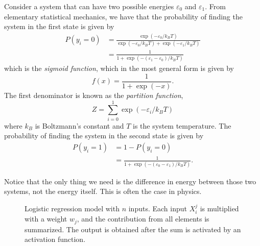 Consider a system that can have two possible energies $\varepsilon_0$ and $\varepsilon_1$. From elementary statistical mechanics, we have that the probability of finding the system in the first state is given by
\begin{align}
P(y_i=0)&=\frac{\exp(-\varepsilon_0/k_BT)}{\exp(-\varepsilon_0/k_BT)+\exp(-\varepsilon_1/k_BT)}\\
&=\frac{1}{1+\exp(-(\varepsilon_1-\varepsilon_0)/k_BT)}
\end{align}
which is the \textit{sigmoid function}, which in the most general form is given by
\begin{equation}
f(x)=\frac{1}{1+\exp(-x)}.
\end{equation}
The first denominator is known as the \textit{partition function},
\begin{equation}
Z=\sum_{i=0}^1\exp(-\varepsilon_i/k_BT)
\label{eq:partition}
\end{equation}
where $k_B$ is Boltzmann's constant and $T$ is the system temperature. The probability of finding the system in the second state is given by
\begin{align}
P(y_i=1)&=1-P(y_i=0)\\
&=\frac{1}{1+\exp(-(\varepsilon_0-\varepsilon_1)/k_BT)}.
\end{align}

Notice that the only thing we need is the difference in energy between those two systems, not the energy itself. This is often the case in physics. 

\begin{figure}
	\centering
	
	\caption{Logistic regression model with $n$ inputs. Each input $X_i^j$ is multiplied with a weight $w_j$, and the contribution from all elements is summarized. The output is obtained after the sum is activated by an activation function.}
	\label{fig:single_perceptron}
\end{figure}

